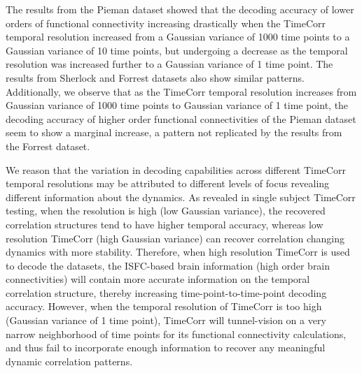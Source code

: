 \documentclass[11pt]{article}
\begin{document}
The results from the Pieman dataset showed that the decoding accuracy of lower orders of functional connectivity increasing drastically when the TimeCorr temporal resolution increased from a Gaussian variance of 1000 time points to a Gaussian variance of 10 time points, but undergoing a decrease as the temporal resolution was increased further to a Gaussian variance of 1 time point. The results from Sherlock and Forrest datasets also show similar patterns. Additionally, we observe that as the TimeCorr temporal resolution increases from Gaussian variance of 1000 time points to Gaussian variance of 1 time point, the decoding accuracy of higher order functional connectivities of the Pieman dataset seem to show a marginal increase, a pattern not replicated by the results from the Forrest dataset.

We reason that the variation in decoding capabilities across different TimeCorr temporal resolutions may be attributed to different levels of focus revealing different information about the dynamics. As revealed in single subject TimeCorr testing, when the resolution is high (low Gaussian variance), the recovered correlation structures tend to have higher temporal accuracy, whereas low resolution TimeCorr (high Gaussian variance) can recover correlation changing dynamics with more stability. Therefore, when high resolution TimeCorr is used to decode the datasets, the ISFC-based brain information (high order brain connectivities) will contain more accurate information on the temporal correlation structure, thereby increasing time-point-to-time-point decoding accuracy. However, when the temporal resolution of TimeCorr is too high (Gaussian variance of 1 time point), TimeCorr will tunnel-vision on a very narrow neighborhood of time points for its functional connectivity calculations, and thus fail to incorporate enough information to recover any meaningful dynamic correlation patterns.
\end{document}

